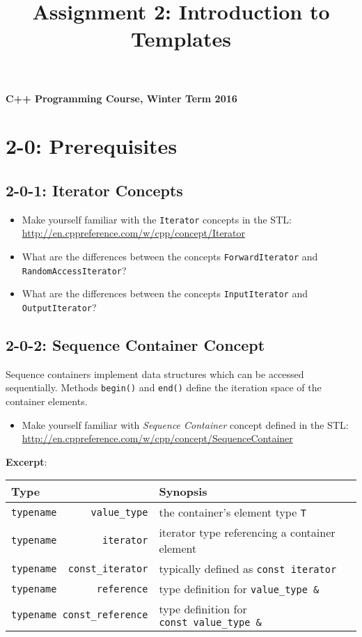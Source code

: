 \documentclass[]{article}
\title{Assignment 2: Introduction to Templates}
\date{}
\providecommand{\tightlist}{%
  \setlength{\itemsep}{0pt}\setlength{\parskip}{0pt}}
\begin{document}
\maketitle

\textbf{C++ Programming Course, Winter Term 2016}

\section{2-0: Prerequisites}\label{prerequisites}

\subsection{2-0-1: Iterator Concepts}\label{iterator-concepts}

\begin{itemize}
\tightlist
\item
  Make yourself familiar with the \texttt{Iterator} concepts in the
  STL:\\
   \url{http://en.cppreference.com/w/cpp/concept/Iterator}
\item
  What are the differences between the concepts \texttt{ForwardIterator}
  and \texttt{RandomAccessIterator}?
\item
  What are the differences between the concepts \texttt{InputIterator}
  and \texttt{OutputIterator}?
\end{itemize}

\subsection{2-0-2: Sequence Container
Concept}\label{sequence-container-concept}

Sequence containers implement data structures which can be accessed
sequentially. Methods \texttt{begin()} and \texttt{end()} define the
iteration space of the container elements.

\begin{itemize}
\tightlist
\item
  Make yourself familiar with \emph{Sequence Container} concept defined
  in the STL:\\
   \url{http://en.cppreference.com/w/cpp/concept/SequenceContainer}
\end{itemize}

\textbf{Excerpt}:

\begin{longtable}[c]{@{}ll@{}}
\toprule
Type & Synopsis\tabularnewline
\midrule
\endhead
\texttt{typename\ \ \ \ \ \ value\_type} & the container's element type
\texttt{T}\tabularnewline
\texttt{typename\ \ \ \ \ \ \ \ iterator} & iterator type referencing a
container element\tabularnewline
\texttt{typename\ \ const\_iterator} & typically defined as
\texttt{const\ iterator}\tabularnewline
\texttt{typename\ \ \ \ \ \ \ reference} & type definition for
\texttt{value\_type\ \&}\tabularnewline
\texttt{typename\ const\_reference} & type definition for
\texttt{const\ value\_type\ \&}\tabularnewline
\bottomrule
\end{longtable}
\end{document}
